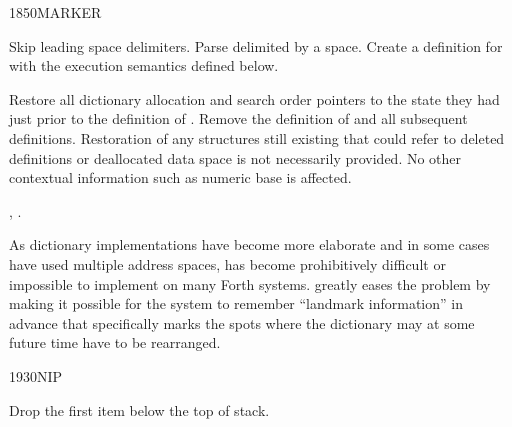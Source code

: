 \begin{worddef}{1850}{MARKER}
\item {}

	Skip leading space delimiters. Parse  delimited by
	a space. Create a definition for  with the execution
	semantics defined below.

\execute[name]
	\stack{}{}

	Restore all dictionary allocation and search order pointers to
	the state they had just prior to the definition of .
	Remove the definition of  and all subsequent
	definitions. Restoration of any structures still existing that
	could refer to deleted definitions or deallocated data space is
	not necessarily provided. No other contextual information such
	as numeric base is affected.

\see {},
	.

	\begin{defer}
	\rationale %
		As dictionary implementations have become more elaborate
		and in some cases have used multiple address spaces,
		 has become prohibitively difficult or
		impossible to implement on many Forth systems. 
		greatly eases the problem by making it possible for the
		system to remember ``landmark information'' in advance that
		specifically marks the spots where the dictionary may at some
		future time have to be rearranged.
	\end{defer}
\end{worddef}


\begin{worddef}{1930}{NIP}
\item {}

	Drop the first item below the top of stack.
\end{worddef}


